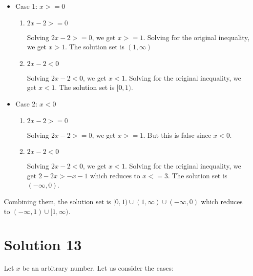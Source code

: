 \documentclass{article}
\begin{document}
\begin{itemize}
\item Case 1: $x >= 0$

  \begin{enumerate}
  \item $2x - 2 >= 0$

    Solving $2x - 2 >= 0$, we get $x >= 1$. Solving for the original
    inequality, we get $ x > 1$. The solution set is $(1, \infty)$
    
  \item $2x - 2 < 0$

    Solving $2x - 2 < 0$, we get $x < 1$. Solving for the original
    inequality, we get $x < 1$. The solution set is $[0, 1)$.
  \end{enumerate}

\item Case 2: $x < 0$

  \begin{enumerate}
  \item $2x - 2 >= 0$

    Solving $2x - 2 >= 0$, we get $x >= 1$. But this is false since
    $x < 0$.
    
  \item $2x - 2 < 0$

    Solving $2x - 2 < 0$, we get $x < 1$. Solving for the original
    inequality, we get $2 - 2x > -x - 1$ which reduces to $x <= 3$.
    The solution set is $(-\infty, 0)$.
  \end{enumerate}

\end{itemize}

Combining them, the solution set is
$[0, 1) \cup (1, \infty) \cup (-\infty, 0)$ which reduces to
$(-\infty, 1) \cup [1, \infty)$.

\section{Solution 13}

Let $x$ be an arbitrary number. Let us consider the cases:
\end{document}
